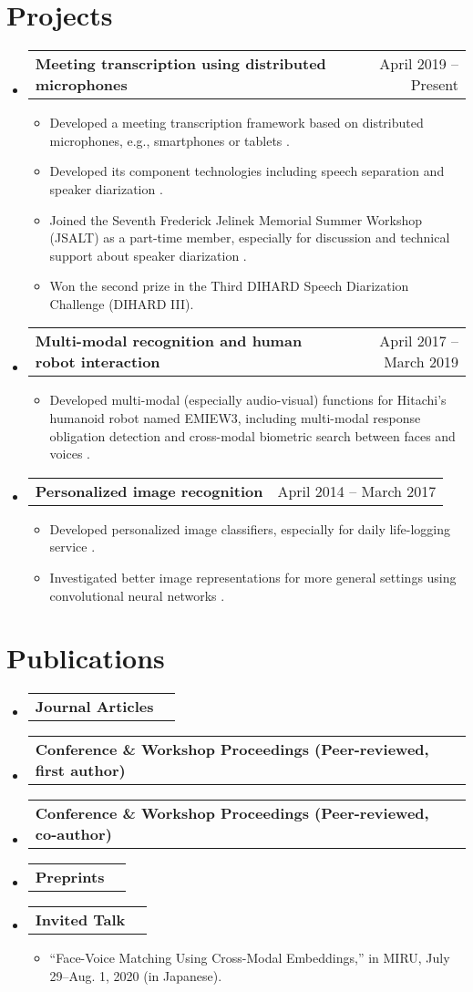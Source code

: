 \documentclass[letterpaper,11pt]{article}
\makeatletter
\newcommand{\resumeItem}[1]{
  \item\small{
    {#1 \vspace{-2pt}}
  }
}
\newcommand{\resumeShortSubheading}[2]{
  \vspace{-2pt}\item
    \begin{tabular*}{0.97\textwidth}[t]{l@{\extracolsep{\fill}}r}
      \textbf{#1} & #2 \\
    \end{tabular*}\vspace{-7pt}
}
\newcommand{\resumeProjectHeading}[2]{
    \item
    \begin{tabular*}{0.97\textwidth}{l@{\extracolsep{\fill}}r}
      \small#1 & #2 \\
    \end{tabular*}\vspace{-7pt}
}
\newcommand{\resumeSubHeadingListStart}{\begin{itemize}[leftmargin=0.15in, label={}]}
\newcommand{\resumeSubHeadingListEnd}{\end{itemize}}
\newcommand{\resumeItemListStart}{\begin{itemize}}
\newcommand{\resumeItemListEnd}{\end{itemize}\vspace{-5pt}}
\makeatother
\begin{document}
\section{Projects}
    \resumeSubHeadingListStart
      \resumeProjectHeading
          {\textbf{Meeting transcription using distributed microphones}}{April 2019 -- Present}
          \resumeItemListStart
            \resumeItem{Developed a meeting transcription framework based on distributed microphones, e.g., smartphones or tablets \cite{horiguchi2020utterancewise}.}
            \resumeItem{Developed its component technologies including speech separation \cite{horiguchi2021blockonline} and speaker diarization \cite{horiguchi2020endtoend,horiguchi2021endtoend}.}
            \resumeItem{Joined the Seventh Frederick Jelinek Memorial Summer Workshop (JSALT) as a part-time member, especially for discussion and technical support about speaker diarization \cite{horiguchi2021endtoend}.}
            \resumeItem{Won the second prize in the Third DIHARD Speech Diarization Challenge (DIHARD III).}
          \resumeItemListEnd
      \resumeProjectHeading
          {\textbf{Multi-modal recognition and human robot interaction}}{April 2017 -- March 2019}
          \resumeItemListStart
            \resumeItem{Developed multi-modal (especially audio-visual) functions for Hitachi's humanoid robot named EMIEW3, including multi-modal response obligation detection \cite{horiguchi2019multimodal} and cross-modal biometric search between faces and voices \cite{horiguchi2018facevoice}.}
          \resumeItemListEnd
      \resumeProjectHeading
          {\textbf{Personalized image recognition}}{April 2014 -- March 2017}
          \resumeItemListStart
            \resumeItem{Developed personalized image classifiers, especially for daily life-logging service \cite{horiguchi2018personalized}.}
            \resumeItem{Investigated better image representations for more general settings using convolutional neural networks \cite{horiguchi2020significance}.}
          \resumeItemListEnd
    \resumeSubHeadingListEnd


\section{Publications}
  \resumeSubHeadingListStart
    \resumeShortSubheading
      {Journal Articles}{}
      \nocite{*}
      \printbibliography[type=article,heading=none]
    \resumeShortSubheading
      {Conference \& Workshop Proceedings (Peer-reviewed, first author)}{}
      \printbibliography[type=inproceedings,heading=none,keyword=first]
    \resumeShortSubheading
      {Conference \& Workshop Proceedings (Peer-reviewed, co-author)}{}
      \printbibliography[type=inproceedings,heading=none,notkeyword=first]
    \resumeShortSubheading
      {Preprints}{}
      \printbibliography[type=misc,heading=none]
    \resumeShortSubheading
      {\textbf{Invited Talk}}{}
      \resumeItemListStart
        \resumeItem{``Face-Voice Matching Using Cross-Modal Embeddings,'' in MIRU, July 29--Aug. 1, 2020 (in Japanese).}
      \resumeItemListEnd
  \resumeSubHeadingListEnd
\end{document}
